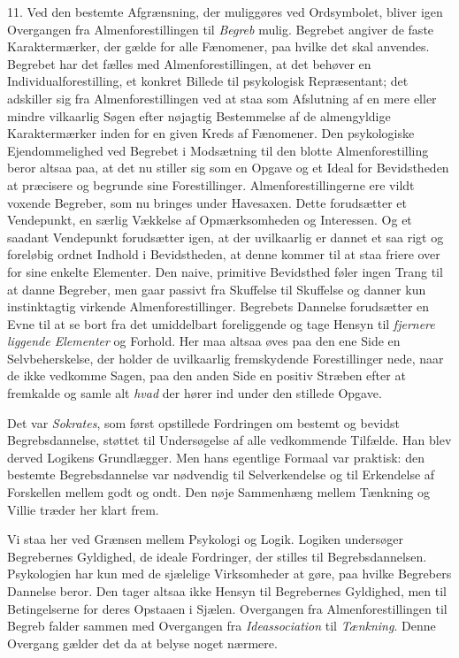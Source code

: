 \documentclass[12pt,a4paper,openany]{book}
\newcommand{\opage}[1]{\marginnote{\footnotesize\textit{[#1]}}}
\begin{document}
11. Ved den bestemte Afgrænsning, der muliggøres ved Ordsymbolet, bliver
igen Overgangen fra Almenforestillingen til \emph{Begreb} mulig.
Begrebet angiver de faste Karaktermærker, der gælde for alle Fænomener,
paa hvilke det skal anvendes. Begrebet har det fælles med
Almenforestillingen, at det behøver en Individualforestilling, et
konkret Billede til psykologisk Repræsentant; det adskiller sig fra
Almenforestillingen ved at staa som Afslutning af en mere eller mindre
vilkaarlig
\opage{210}Søgen efter nøjagtig Bestemmelse af de almengyldige
Karaktermærker inden for en given Kreds af Fænomener. Den psykologiske
Ejendommelighed ved Begrebet i Modsætning til den blotte
Almenforestilling beror altsaa paa, at det nu stiller sig som en Opgave
og et Ideal for Bevidstheden at præcisere og begrunde sine
Forestillinger. Almenforestillingerne ere vildt voxende Begreber, som nu
bringes under Havesaxen. Dette forudsætter et Vendepunkt, en særlig
Vækkelse af Opmærksomheden og Interessen. Og et saadant Vendepunkt
forudsætter igen, at der uvilkaarlig er dannet et saa rigt og foreløbig
ordnet Indhold i Bevidstheden, at denne kommer til at staa friere over
for sine enkelte Elementer. Den naive, primitive Bevidsthed føler ingen
Trang til at danne Begreber, men gaar passivt fra Skuffelse til
Skuffelse og danner kun instinktagtig virkende Almenforestillinger.
Begrebets Dannelse forudsætter en Evne til at se bort fra det
umiddelbart foreliggende og tage Hensyn til \emph{fjernere liggende
Elementer} og Forhold. Her maa altsaa øves paa den ene Side en
Selvbeherskelse, der holder de uvilkaarlig fremskydende Forestillinger
nede, naar de ikke vedkomme Sagen, paa den anden Side en positiv Stræben
efter at fremkalde og samle alt \emph{hvad} der hører ind under den
stillede Opgave.

Det var \emph{Sokrates}, som først opstillede Fordringen om bestemt og
bevidst Begrebsdannelse, støttet til Undersøgelse af alle vedkommende
Tilfælde. Han blev derved Logikens Grundlægger. Men hans egentlige
Formaal var praktisk: den bestemte Begrebsdannelse var nødvendig til
Selverkendelse og til Erkendelse af Forskellen mellem godt og ondt. Den
nøje Sammenhæng mellem Tænkning og Villie træder her klart frem.

Vi staa her ved Grænsen mellem Psykologi og Logik. Logiken undersøger
Begrebernes Gyldighed, de ideale Fordringer, der stilles til
Begrebsdannelsen. Psykologien har kun med de sjælelige Virksomheder at
gøre, paa hvilke Begrebers Dannelse beror. Den tager altsaa ikke Hensyn
til Begrebernes Gyldighed, men til Betingelserne for deres Opstaaen i
Sjælen. Overgangen fra Almenforestillingen til Begreb falder sammen med
Overgangen fra \emph{Ideassociation} til \emph{Tænkning}. Denne Overgang
gælder det da at belyse noget nærmere.
\end{document}
